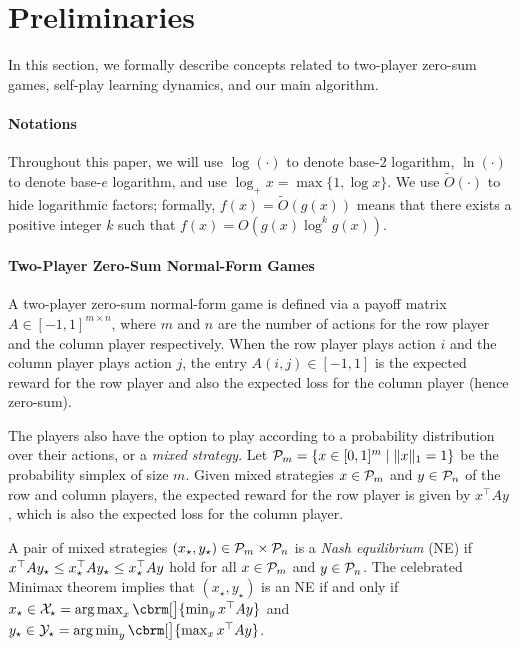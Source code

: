 \section{Preliminaries}
In this section, we formally describe concepts related to two-player zero-sum games, self-play learning dynamics, and our main algorithm.

\paragraph{Notations}
Throughout this paper, we will use $\log(\cdot)$ to denote base-$2$ logarithm, $\ln(\cdot)$ to denote base-$e$ logarithm, and use $\log_+ x = \max \{ 1, \log x \}$. We use $\tilde{O}(\cdot)$ to hide logarithmic factors; formally, $f(x)=\tilde{O}(g(x))$ means that there exists a positive integer $k$ such that $f(x)=O(g(x) \log^k g(x))$.

\paragraph{Two-Player Zero-Sum Normal-Form Games}
A two-player zero-sum normal-form game is defined via a payoff matrix $A \in [-1, 1]^{m \times n}$,
where $m$ and $n$ are the number of actions for the row player and the column player respectively.
When the row player plays action $i$ and the column player plays action $j$,
the entry $A(i, j) \in [-1, 1]$ is the expected reward for the row player and also the expected loss for the column player (hence zero-sum).

The players also have the option to play according to a probability distribution over their actions, or a \emph{mixed strategy}.
Let $\mathcal{P}_m = \{ x \in [0, 1]^m \mid \| x \|_1 = 1 \}$ be the probability simplex of size $m$.
Given mixed strategies $x \in \mathcal{P}_m$ and $y \in \mathcal{P}_n$ of the row and column players,
the expected reward for the row player is given by
$x^\top A y$, which is also the expected loss for the column player.

A pair of mixed strategies $(x_{\star}, y_{\star}) \in \mathcal{P}_m \times \mathcal{P}_n$ is a \textit{Nash equilibrium} (NE) if
$
x^{\top} A y_{\star}
\le
x_{\star}^{ \top} A y_{\star}
\le
x_{\star}^{\top} A y 
$
hold for all $x \in \mathcal{P}_m$ and $y \in \mathcal{P}_n$.
The celebrated Minimax theorem \citep{vonneumann1928theory} implies that $(x_\star, y_\star)$ is an NE if and only if $x_\star \in  \xstarset = \argmax_{x} \cbrm[\big]{\min_y x^\top A y}$ and $y_\star \in \ystarset = \argmin_{y} \cbrm[\big]{\max_x x^\top A y}$.

